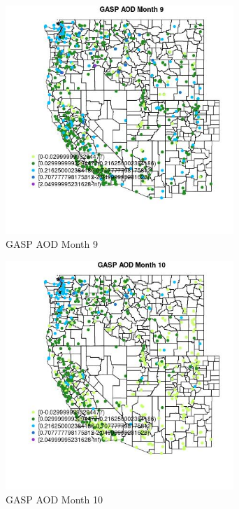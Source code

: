 \begin{figure} 
\centering  
\includegraphics[width=0.77\textwidth]{Code_Outputs/Report_ML_input_PM25_Step4_part_e_de_duplicated_aves_compiled_2019-05-21wNAs_MapObsMo9GASP_AOD.jpg} 
\caption{\label{fig:Report_ML_input_PM25_Step4_part_e_de_duplicated_aves_compiled_2019-05-21wNAsMapObsMo9GASP_AOD}GASP AOD Month 9} 
\end{figure} 
 

\begin{figure} 
\centering  
\includegraphics[width=0.77\textwidth]{Code_Outputs/Report_ML_input_PM25_Step4_part_e_de_duplicated_aves_compiled_2019-05-21wNAs_MapObsMo10GASP_AOD.jpg} 
\caption{\label{fig:Report_ML_input_PM25_Step4_part_e_de_duplicated_aves_compiled_2019-05-21wNAsMapObsMo10GASP_AOD}GASP AOD Month 10} 
\end{figure} 
 

